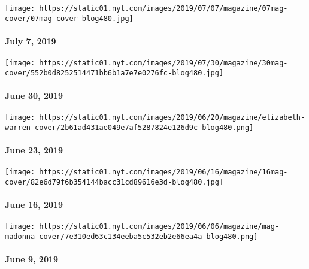 \href{https://www.nytimes.com/issue/magazine/2019/07/09/the-7719-issue}{}

\texttt{[image: https://static01.nyt.com/images/2019/07/07/magazine/07mag-cover/07mag-cover-blog480.jpg]}

\hypertarget{july-7-2019}{%
\paragraph{July 7, 2019}\label{july-7-2019}}

\href{https://www.nytimes.com/issue/magazine/2019/07/01/the-63019-issue}{}

\texttt{[image: https://static01.nyt.com/images/2019/07/30/magazine/30mag-cover/552b0d8252514471bb6b1a7e7e0276fc-blog480.jpg]}

\hypertarget{june-30-2019}{%
\paragraph{June 30, 2019}\label{june-30-2019}}

\href{https://www.nytimes.com/issue/magazine/2019/06/25/the-62319-issue}{}

\texttt{[image: https://static01.nyt.com/images/2019/06/20/magazine/elizabeth-warren-cover/2b61ad431ae049e7af5287824e126d9c-blog480.png]}

\hypertarget{june-23-2019}{%
\paragraph{June 23, 2019}\label{june-23-2019}}

\href{https://www.nytimes.com/issue/magazine/2019/06/25/the-61619-issue}{}

\texttt{[image: https://static01.nyt.com/images/2019/06/16/magazine/16mag-cover/82e6d79f6b354144bacc31cd89616e3d-blog480.jpg]}

\hypertarget{june-16-2019}{%
\paragraph{June 16, 2019}\label{june-16-2019}}

\href{https://www.nytimes.com/issue/magazine/2019/06/25/the-6919-issue}{}

\texttt{[image: https://static01.nyt.com/images/2019/06/06/magazine/mag-madonna-cover/7e310ed63c134eeba5c532eb2e66ea4a-blog480.png]}

\hypertarget{june-9-2019}{%
\paragraph{June 9, 2019}\label{june-9-2019}}


